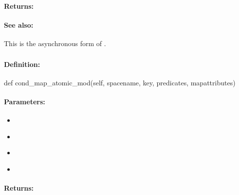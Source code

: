\paragraph{Returns:}


\paragraph{See also:}  This is the asynchronous form of .

\pagebreak
\subsubsection{}
\label{api:python:cond_map_atomic_mod}


\paragraph{Definition:}
\begin{pythoncode}
def cond_map_atomic_mod(self, spacename, key, predicates, mapattributes)
\end{pythoncode}

\paragraph{Parameters:}
\begin{itemize}[noitemsep]
\item {}\\

\item {}\\

\item {}\\

\item {}\\

\end{itemize}

\paragraph{Returns:}


